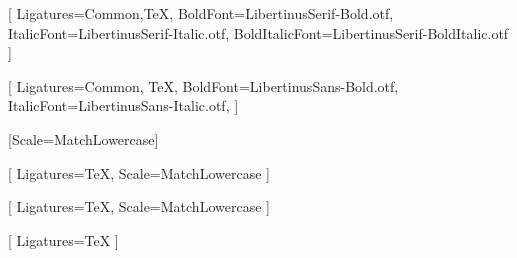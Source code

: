 %



\setmainfont{LibertinusSerif-Regular.otf}[
    Ligatures={Common,TeX},
    BoldFont=LibertinusSerif-Bold.otf,
    ItalicFont=LibertinusSerif-Italic.otf,
    BoldItalicFont=LibertinusSerif-BoldItalic.otf
]

\setsansfont{LibertinusSans-Regular.otf}[
    Ligatures={Common, TeX},
    BoldFont=LibertinusSans-Bold.otf,
    ItalicFont=LibertinusSans-Italic.otf,
]

\setmonofont{Consolas}[Scale=MatchLowercase]

[
    Ligatures=TeX,
    Scale=MatchLowercase
]

\setmathfontface{}[
    Ligatures=TeX,
    Scale=MatchLowercase
]
\setoperatorfont\mathoper

\newfontface{}[
    Ligatures=TeX
]
